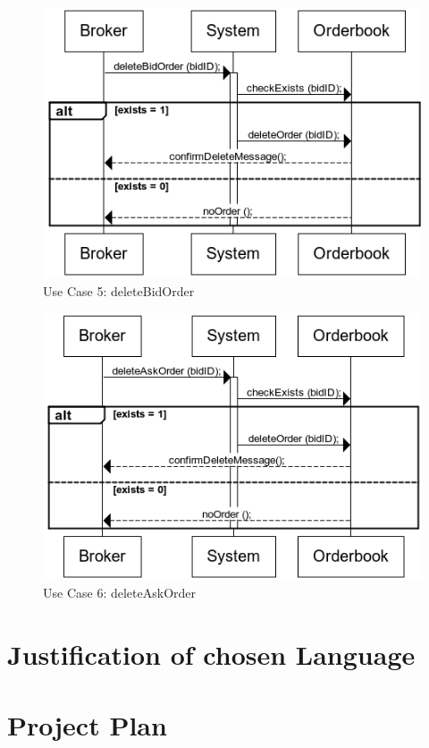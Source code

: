 \documentclass[a4paper]{article}
\begin{document}
\begin{figure}[H]
   \includegraphics[width=1\textwidth]{images/deleteBidOrder}
   \caption{Use Case 5: deleteBidOrder}
\end{figure}

\begin{figure}[H]
   \includegraphics[width=1\textwidth]{images/deleteAskOrder}
   \caption{Use Case 6: deleteAskOrder}
\end{figure}

\section {Justification of chosen Language}

\section {Project Plan}
\end{document}
